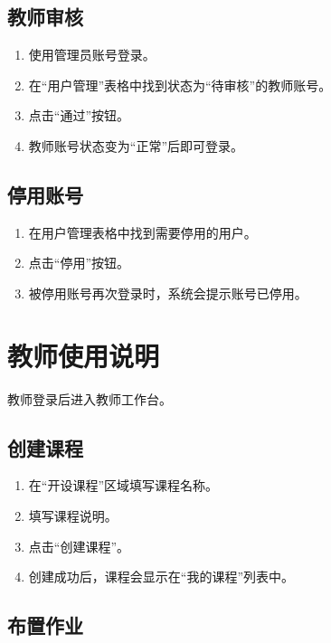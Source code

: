 \documentclass[UTF8,12pt]{ctexart}
\begin{document}

\subsection{教师审核}

\begin{enumerate}
  \item 使用管理员账号登录。
  \item 在“用户管理”表格中找到状态为“待审核”的教师账号。
  \item 点击“通过”按钮。
  \item 教师账号状态变为“正常”后即可登录。
\end{enumerate}

\subsection{停用账号}

\begin{enumerate}
  \item 在用户管理表格中找到需要停用的用户。
  \item 点击“停用”按钮。
  \item 被停用账号再次登录时，系统会提示账号已停用。
\end{enumerate}

\newpage

\section{教师使用说明}

教师登录后进入教师工作台。


\subsection{创建课程}

\begin{enumerate}
  \item 在“开设课程”区域填写课程名称。
  \item 填写课程说明。
  \item 点击“创建课程”。
  \item 创建成功后，课程会显示在“我的课程”列表中。
\end{enumerate}

\subsection{布置作业}
\end{document}
